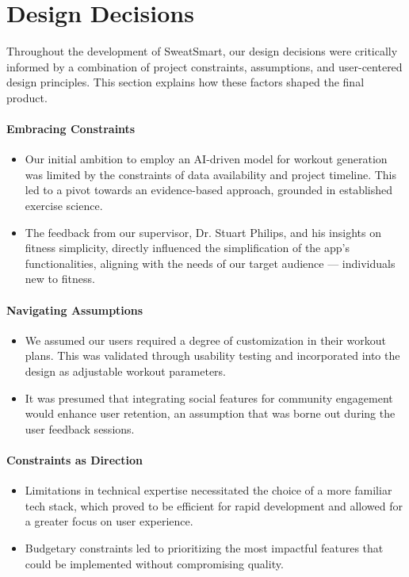 \documentclass{article}
\begin{document}

\section{Design Decisions}

Throughout the development of SweatSmart, our design decisions were critically informed by a combination of project constraints, assumptions, and user-centered design principles. This section explains how these factors shaped the final product.

\paragraph{Embracing Constraints}
\begin{itemize}
    \item Our initial ambition to employ an AI-driven model for workout generation was limited by the constraints of data availability and project timeline. This led to a pivot towards an evidence-based approach, grounded in established exercise science.
    \item The feedback from our supervisor, Dr. Stuart Philips, and his insights on fitness simplicity, directly influenced the simplification of the app’s functionalities, aligning with the needs of our target audience — individuals new to fitness.
\end{itemize}

\paragraph{Navigating Assumptions}
\begin{itemize}
    \item We assumed our users required a degree of customization in their workout plans. This was validated through usability testing and incorporated into the design as adjustable workout parameters.
    \item It was presumed that integrating social features for community engagement would enhance user retention, an assumption that was borne out during the user feedback sessions.
\end{itemize}

\paragraph{Constraints as Direction}
\begin{itemize}
    \item Limitations in technical expertise necessitated the choice of a more familiar tech stack, which proved to be efficient for rapid development and allowed for a greater focus on user experience.
    \item Budgetary constraints led to prioritizing the most impactful features that could be implemented without compromising quality.
\end{itemize}
\end{document}
